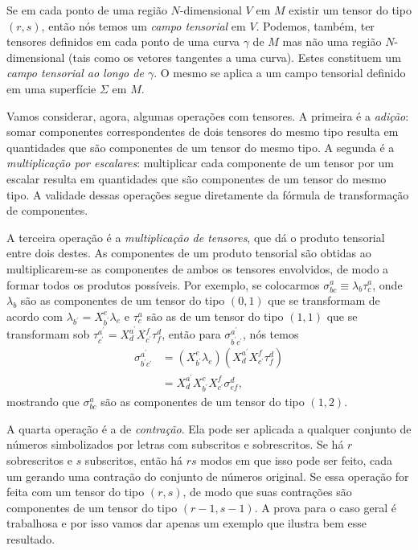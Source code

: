 Se em cada ponto de uma região $N$-dimensional $V$ em $M$ existir um tensor do tipo $(r,s)$, então nós temos um \textit{campo tensorial} em $V$. Podemos, também, ter tensores definidos em cada ponto de uma curva $\gamma$ de $M$ mas não uma região $N$-dimensional (tais como os vetores tangentes a uma curva). Estes constituem um \textit{campo tensorial ao longo de $\gamma$}. O mesmo se aplica a um campo tensorial definido em uma superfície $\Sigma$ em $M$.

Vamos considerar, agora, algumas operações com tensores. A primeira é a \textit{adição}: somar componentes correspondentes de dois tensores do mesmo tipo resulta em quantidades que são componentes de um tensor do mesmo tipo. A segunda é a \textit{multiplicação por escalares}: multiplicar cada componente de um tensor por um escalar resulta em quantidades que são componentes de um tensor do mesmo tipo. A validade dessas operações segue diretamente da fórmula de transformação de componentes.

A terceira operação é a \textit{multiplicação de tensores}, que dá o produto tensorial entre dois destes. As componentes de um produto tensorial são obtidas ao multiplicarem-se as componentes de ambos os tensores envolvidos, de modo a formar todos os produtos possíveis. Por exemplo, se colocarmos $\sigma^a_{bc}\equiv\lambda_b\tau^a_c$, onde $\lambda_b$ são as componentes de um tensor do tipo $(0,1)$ que se transformam de acordo com $\lambda_{b^\prime}=X^e_{b^\prime}\lambda_e$ e $\tau^a_c$ são as de um tensor do tipo $(1,1)$ que se transformam sob $\tau^{a^\prime}_{c^\prime}=X^{a^\prime}_dX^f_{c^\prime}\tau^d_f$, então para $\sigma^{a^\prime}_{b^\prime c^\prime}$, nós temos
\[
\begin{aligned} \sigma_{b^{\prime} c^{\prime}}^{a^{\prime}} &=\left(X_{b^{\prime}}^{e} \lambda_{e}\right)\left(X_{d}^{a^{\prime}} X_{c^{\prime}}^{f} \tau_{f}^{d}\right) \\ &=X_{d}^{a^{\prime}} X_{b^{\prime}}^{e} X_{c^{\prime}}^{f} \sigma_{e f}^{d}  ,
\end{aligned}
\]
mostrando que $\sigma^a_{bc}$ são as componentes de um tensor do tipo $(1,2)$.

A quarta operação é a de \textit{contração}. Ela pode ser aplicada a qualquer conjunto de números simbolizados por letras com subscritos e sobrescritos. Se há $r$ sobrescritos e $s$ subscritos, então há $rs$ modos em que isso pode ser feito, cada um gerando uma contração do conjunto de números original. Se essa operação for feita com um tensor do tipo $(r,s)$, de modo que suas contrações são componentes de um tensor do tipo $(r-1,s-1)$. A prova para o caso geral é trabalhosa e por isso vamos dar apenas um exemplo que ilustra bem esse resultado.


